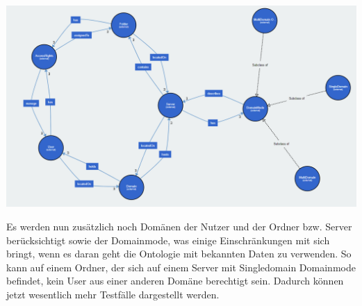 \includegraphics{Thesis/Images/OntologyBig.png}

Es werden nun zusätzlich noch Domänen der Nutzer und der Ordner bzw. Server berücksichtigt sowie der Domainmode, was einige Einschränkungen mit sich bringt, wenn es daran geht die Ontologie mit bekannten Daten zu verwenden. So kann auf einem Ordner, der sich auf einem Server mit Singledomain Domainmode befindet, kein User aus einer anderen Domäne berechtigt sein. Dadurch können jetzt wesentlich mehr Testfälle dargestellt werden. 
